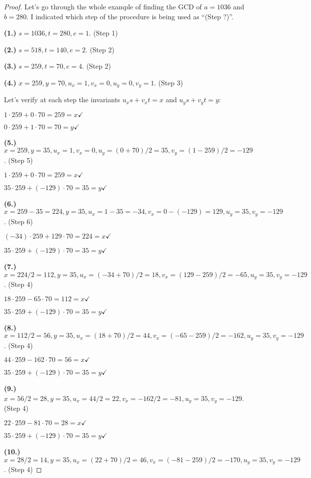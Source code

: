 \documentclass[14pt]{extarticle}
\begin{document}
\begin{proof}
Let's go through the whole example of finding the GCD of $a=1036$ and $b=280$. I indicated which step of the procedure is being used as ``(Step ?)''.

{\bf (1.)} $s = 1036, t = 280, e = 1$. (Step 1)

{\bf (2.)} $s = 518, t = 140, e = 2$. (Step 2)

{\bf (3.)} $s = 259, t = 70, e = 4$. (Step 2)

{\bf (4.)} $x = 259, y = 70, u_x = 1, v_x = 0, u_y = 0, v_y = 1$. (Step 3)

Let's verify at each step the invariants $u_xs+v_xt = x$ and $u_ys+v_yt = y$:

$1 \cdot 259 + 0 \cdot 70 = 259 = x \checkmark$

$0 \cdot 259 + 1 \cdot 70 = 70 = y \checkmark$

{\bf (5.)} $x = 259, y = 35, u_x = 1, v_x = 0, u_y = (0+70)/2 = 35, v_y = (1-259)/2 = -129$. (Step 5)

$1 \cdot 259 + 0 \cdot 70 = 259 = x \checkmark$

$35 \cdot 259 + (-129) \cdot 70 = 35 = y \checkmark$

{\bf (6.)} $x = 259 - 35 = 224, y = 35, u_x = 1 - 35 = -34, v_x = 0 - (-129) = 129, u_y = 35, v_y = -129$. (Step 6)

$(-34) \cdot 259 + 129 \cdot 70 = 224 = x \checkmark$

$35 \cdot 259 + (-129) \cdot 70 = 35 = y \checkmark$

{\bf (7.)} $x = 224 / 2 = 112, y = 35, u_x = (-34 + 70) / 2 = 18, v_x = (129 - 259)/2 = -65, u_y = 35, v_y = -129$. (Step 4)

$18 \cdot 259 -65 \cdot 70 = 112 = x \checkmark$

$35 \cdot 259 + (-129) \cdot 70 = 35 = y \checkmark$

{\bf (8.)} $x = 112 / 2 = 56, y = 35, u_x = (18 + 70) / 2 = 44, v_x = (-65 - 259)/2 = -162, u_y = 35, v_y = -129$. (Step 4)

$44 \cdot 259 -162 \cdot 70 = 56 = x \checkmark$

$35 \cdot 259 + (-129) \cdot 70 = 35 = y \checkmark$

{\bf (9.)} $x = 56 / 2 = 28, y = 35, u_x = 44 / 2 = 22, v_x = -162 / 2 = -81, u_y = 35, v_y = -129$. (Step 4)

$22 \cdot 259 -81 \cdot 70 = 28 = x \checkmark$

$35 \cdot 259 + (-129) \cdot 70 = 35 = y \checkmark$

{\bf (10.)} $x = 28 / 2 = 14, y = 35, u_x = (22 + 70) / 2 = 46, v_x = (-81-259)/2 = -170, u_y = 35, v_y = -129$. (Step 4)


\end{proof}
\end{document}
